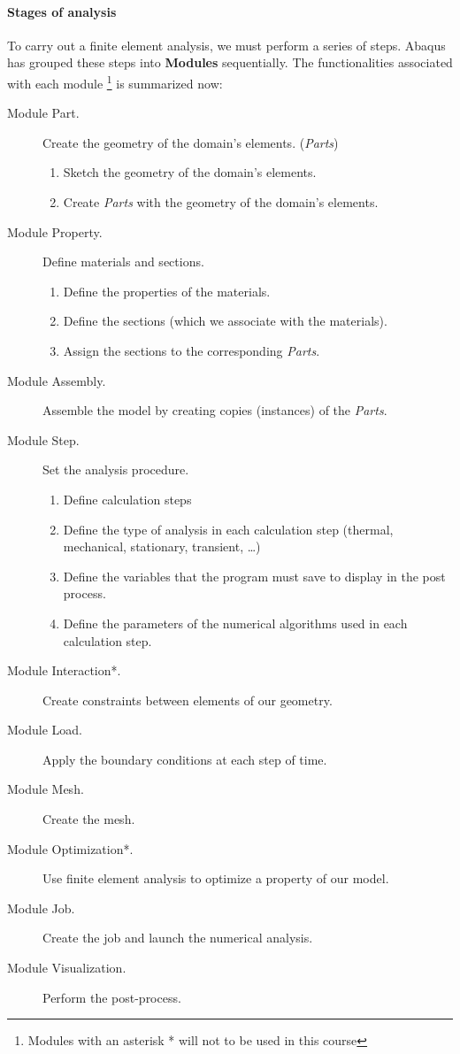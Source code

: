 \paragraph{Stages of analysis} To carry out a finite element analysis, we must perform a series of steps. Abaqus has grouped these steps into \textbf{Modules} sequentially. The functionalities associated with each module 
\footnote{Modules with an asterisk * will not to be used in this course} is summarized now:
\begin{description}
\item[Module Part.] Create the geometry of the domain's elements.
  (\textit{Parts})
  \begin{enumerate}
  \item Sketch the geometry   of the domain's elements.      
  \item Create \textit{Parts} with the geometry   of the domain's elements.
  \end{enumerate}
  
\item[Module Property.] Define materials and sections.
  \begin{enumerate}
  \item Define the properties of the materials.
  \item Define the sections (which we associate with the materials).
  \item Assign the sections to the corresponding \textit{Parts}.
  \end{enumerate}
\item[Module Assembly.] Assemble the model by creating copies (instances) of the \textit{Parts}.
\item[Module Step.] Set the analysis procedure.
  \begin{enumerate}
  \item Define calculation steps
  \item Define the type of analysis in each calculation step (thermal, mechanical, stationary, transient, \ldots)
  \item Define the variables that the program must save to display in the post process.
  \item Define the parameters of the numerical algorithms used in each calculation step.
  \end{enumerate}
\item[Module Interaction*.] Create constraints between elements of our geometry.
\item[Module Load.] 
Apply the boundary conditions at each step of time.
\item[Module Mesh.] Create the mesh.
\item[Module Optimization*.] Use finite element analysis to optimize a property of our model.
\item[Module Job.] Create the job and launch the numerical analysis.
\item[Module Visualization.] Perform the post-process.
\end{description}
 


